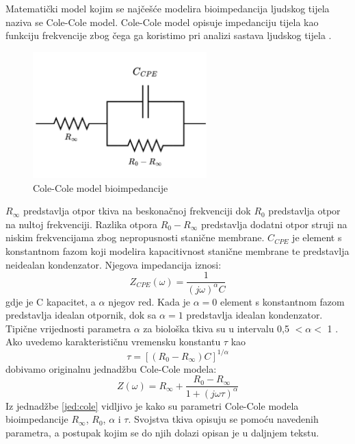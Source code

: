 \documentclass[../diplomski_rad.tex]{subfiles}
\begin{document}
Matematički model kojim se najčešće modelira bioimpedancija ljudskog tijela naziva se Cole-Cole model.  
Cole-Cole model opisuje impedanciju tijela kao funkciju frekvencije zbog čega ga koristimo pri analizi sastava ljudskog tijela \cite{Freeborn2021}.
\begin{figure}[htb]
    \centering
    \includegraphics[width=0.6\textwidth]{Figures/cole_model.png} 
    \caption{Cole-Cole model bioimpedancije}
    \label{slk:cole_model}
\end{figure}
$R_{\infty}$ predstavlja otpor tkiva na beskonačnoj frekvenciji dok $R_{0}$ predstavlja otpor na nultoj frekvenciji. 
Razlika otpora $R_{0}-R_{\infty}$ predstavlja dodatni otpor struji na niskim frekvencijama zbog nepropusnosti stanične membrane. 
$C_{CPE}$ je element s konstantnom fazom koji modelira kapacitivnost stanične membrane 
te predstavlja neidealan kondenzator. Njegova impedancija iznosi: 
\begin{equation}
    \label{jed:cpe}
    Z_{CPE}(\omega) = \frac{1}{(j\omega)^{\alpha}C}
\end{equation} 
gdje je C kapacitet, a $\alpha$ njegov red. Kada je $\alpha = 0$ element s konstantnom fazom predstavlja idealan otpornik, 
dok sa $\alpha = 1$ predstavlja idealan kondenzator. 
Tipične vrijednosti parametra $\alpha$ za biološka tkiva su u intervalu 0,5 $< \alpha <$ 1 \cite{Freeborn2021}.
Ako uvedemo karakterističnu vremensku konstantu $\tau$ kao
\begin{equation}
    \label{jed:time_const}
    \tau = [(R_{0}-R_{\infty})C]^{1/\alpha}
\end{equation}
dobivamo originalnu jednadžbu Cole-Cole modela: 
\begin{equation}
    \label{jed:cole}
    Z(\omega) = R_{\infty}+\frac{R_{0}-R_{\infty}}{1+(j\omega\tau)^{\alpha}} 
\end{equation} 
Iz jednadžbe \ref{jed:cole} vidljivo je kako su parametri Cole-Cole modela bioimpedancije 
$R_{\infty}$, $R_{0}$, $\alpha$ i $\tau$. 
Svojstva tkiva opisuju se pomoću navedenih parametra, a postupak kojim se do njih dolazi opisan je u daljnjem tekstu.
\end{document}
